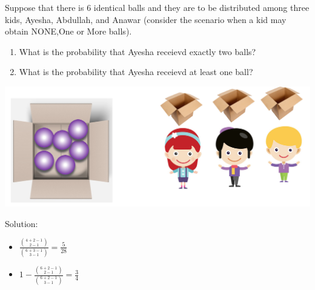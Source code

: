 \documentclass[compress]{beamer}
\begin{document}
\begin{frame}\frametitle{}
Suppose that there is 6 identical balls and they are to be distributed among three kids,  Ayesha, Abdullah, and Anawar  ({\tiny consider the scenario when a kid may obtain NONE,One or More balls}).  
\begin{enumerate}
\item What is the probability that Ayesha receievd exactly two balls?\\
\item  What is the probability that Ayesha receievd at least  one ball?\\
\end{enumerate}

\includegraphics[scale=.32]{figs/6PurpleBass3kids.png}


\pause
{\tiny Solution: 
\begin{itemize}
\item $\frac{ {{4+2-1}\choose {2-1} } }{ {{6+3-1}\choose {3-1}}  }= \frac{5}{28}$
\item $1- \frac{ {{6+2-1}\choose {2-1} } }{ {{6+2-1}\choose {3-1}}  }= \frac{3}{4}$
\end{itemize} 
}
\vspace{.5in}
\end{frame}





%
%
%
%
\end{document}
